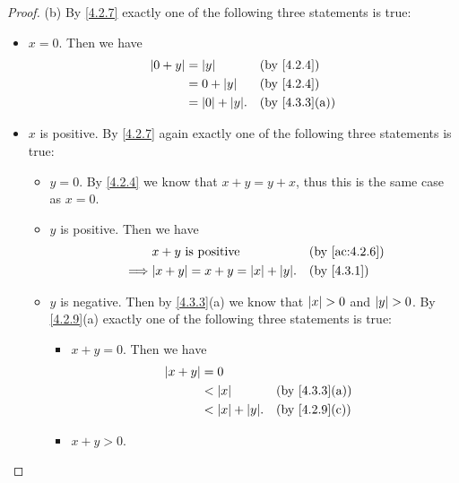 \begin{proof}{(b)}
  By \cref{4.2.7} exactly one of the following three statements is true:
  \begin{itemize}
    \item \(x = 0\).
          Then we have
          \begin{align*}
            \abs{0 + y} & = \abs{y}            &  & \by{4.2.4}                  \\
                        & = 0 + \abs{y}        &  & \by{4.2.4}                  \\
                        & = \abs{0} + \abs{y}. &  & \text{(by \cref{4.3.3}(a))}
          \end{align*}
    \item \(x\) is positive.
          By \cref{4.2.7} again exactly one of the following three statements is true:
          \begin{itemize}
            \item \(y = 0\).
                  By \cref{4.2.4} we know that \(x + y = y + x\), thus this is the same case as \(x = 0\).
            \item \(y\) is positive.
                  Then we have
                  \begin{align*}
                             & x + y \text{ is positive}                &  & \by{ac:4.2.6} \\
                    \implies & \abs{x + y} = x + y = \abs{x} + \abs{y}. &  & \by{4.3.1}
                  \end{align*}
            \item \(y\) is negative.
                  Then by \cref{4.3.3}(a) we know that \(\left\lvert x\right\rvert > 0\) and \(\left\lvert y\right\rvert > 0\).
                  By \cref{4.2.9}(a) exactly one of the following three statements is true:
                  \begin{itemize}
                    \item \(x + y = 0\).
                          Then we have
                          \begin{align*}
                            \abs{x + y} & = 0                                                   \\
                                        & < \abs{x}            &  & \text{(by \cref{4.3.3}(a))} \\
                                        & < \abs{x} + \abs{y}. &  & \text{(by \cref{4.2.9}(c))}
                          \end{align*}
                    \item \(x + y > 0\).

\end{itemize}
\end{itemize}
\end{itemize}
\end{proof}
